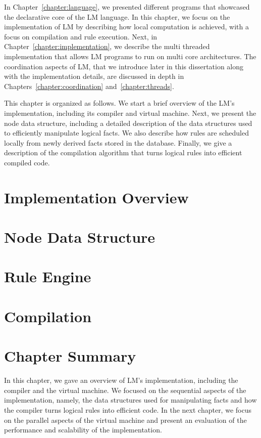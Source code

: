
In Chapter~\ref{chapter:language}, we presented different programs that
showcased the declarative core of the LM language. In this chapter, we focus on
the implementation of LM by describing how local computation is achieved, with a
focus on compilation and rule execution.  Next, in
Chapter~\ref{chapter:implementation}, we describe the multi threaded
implementation that allows LM programs to run on multi core architectures. The
coordination aspects of LM, that we introduce later in this dissertation along
with the implementation details, are discussed in depth in
Chapters~\ref{chapter:coordination} and~\ref{chapter:threads}.

This chapter is organized as follows. We start a brief overview of the LM's
implementation, including its compiler and virtual machine. Next, we present the
node data structure, including a detailed description of the data structures
used to efficiently manipulate logical facts.  We also describe how rules are
scheduled locally from newly derived facts stored in the database.  Finally, we
give a description of the compilation algorithm that turns logical rules into
efficient compiled code.


\section{Implementation Overview}


\section{Node Data Structure}\label{sec:data_structures}


\section{Rule Engine}\label{section:local:rule_engine}\label{sec:implementation:rule_engine}


\section{Compilation}


\section{Chapter Summary}

In this chapter, we gave an overview of LM's implementation, including the
compiler and the virtual machine. We focused on the sequential aspects of the
implementation, namely, the data structures used for manipulating facts and how
the compiler turns logical rules into efficient code. In the next chapter, we
focus on the parallel aspects of the virtual machine and present an evaluation
of the performance and scalability of the implementation.
